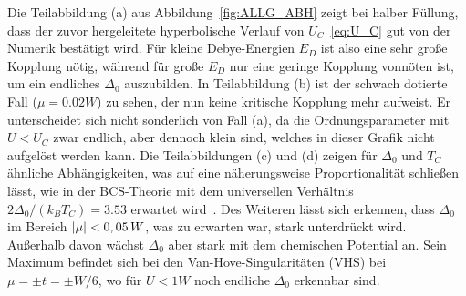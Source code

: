 Die Teilabbildung (a) aus Abbildung~\ref{fig:ALLG_ABH} zeigt bei halber Füllung, dass der zuvor hergeleitete hyperbolische Verlauf von $U_C$~\eqref{eq:U_C} gut von der Numerik bestätigt wird. 
Für kleine Debye-Energien $E_D$ ist also eine sehr große Kopplung nötig, während für große $E_D$ nur eine geringe Kopplung vonnöten ist, um ein endliches $\Delta_0$ auszubilden.
In Teilabbildung (b) ist der schwach dotierte Fall ($\mu = 0.02W$) zu sehen, der nun keine kritische Kopplung mehr aufweist. 
Er unterscheidet sich nicht sonderlich von Fall (a), da die Ordnungsparameter mit $U<U_C$ zwar endlich, aber dennoch klein sind, welches in dieser Grafik nicht aufgelöst werden kann.
Die Teilabbildungen (c) und (d) zeigen für $\Delta_0$ und $T_C$ ähnliche Abhängigkeiten, was auf eine näherungsweise Proportionalität schließen lässt, wie in der BCS-Theorie mit dem universellen Verhältnis $2\Delta_0/(k_B T_C) = \num{3.53}$ erwartet wird~\cite{czycholl_theoretische_2017}.
Des Weiteren lässt sich erkennen, dass $\Delta_0$ im Bereich $\abs{\mu} < 0,05 \, W$, was zu erwarten war, stark unterdrückt wird.
Außerhalb davon wächst $\Delta_0$ aber stark mit dem chemischen Potential an.
Sein Maximum befindet sich bei den Van-Hove-Singularitäten (VHS) bei $\mu = \pm t = \pm W/6$, wo für $U< 1W$ noch endliche $\Delta_0$ erkennbar sind.

